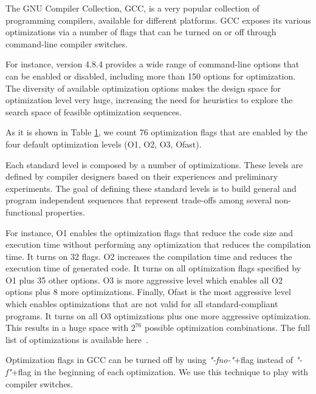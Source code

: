 \begin{table}
{\begin{tabular}[c]{|c|p{7cm}||c|p{7cm}|}
		\end{tabular}
	}
	\label{tab:Compiler optimization options}
	
\end{table}

The GNU Compiler Collection, GCC, is a very popular collection of programming compilers, available for different platforms.
GCC exposes its various optimizations via a number of flags that can be turned on or off through command-line compiler switches. 

For instance, version 4.8.4 provides a wide range of command-line options that can be enabled or disabled, including more than 150 options for optimization. The diversity of available optimization options makes the design space for optimization level very huge, increasing the need for heuristics to explore the search space of feasible optimization sequences.

As it is shown in Table \ref{tab:Compiler optimization options}, we count 76 optimization flags that are enabled by the four default optimization levels (O1, O2, O3, Ofast). 

Each standard level is composed by a number of optimizations. These levels are defined by compiler designers based on their experiences and preliminary experiments. The goal of defining these standard levels is to build general and program independent sequences that represent trade-offs among several non-functional properties.

For instance, O1 enables the optimization flags that reduce the code size and execution time without performing any optimization that reduces the compilation time. It turns on 32 flags. 
O2 increases the compilation time and reduces the execution time of generated code. It turns on all optimization flags specified by O1 plus 35 other options. 
O3 is more aggressive level which enables all O2 options plus 8 more optimizations. 
Finally, Ofast is the most aggressive level which enables optimizations that are not valid for all standard-compliant programs. It turns on all O3 optimizations plus one more aggressive optimization. 
This results in a huge space with $2^{76}$ possible optimization combinations.
The full list of optimizations is available here~\cite{mboussaa}.

Optimization flags in GCC can be turned off by using \textit{"-fno-"}+flag instead of \textit{"-f"}+flag in the beginning of each optimization. 
We use this technique to play with compiler switches.



